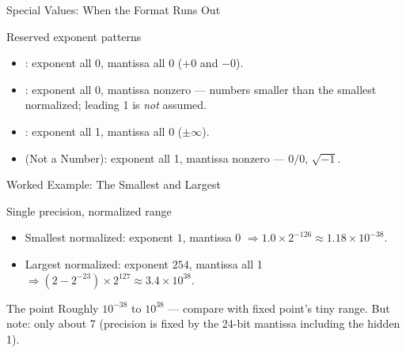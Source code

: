 \documentclass[aspectratio=169]{beamer}
\begin{document}
\begin{frame}{Special Values: When the Format Runs Out}
  \begin{block}{Reserved exponent patterns}
    \begin{itemize}
      \item {}: exponent all 0, mantissa all 0 ($+0$ and $-0$).
      \item {}: exponent all 0, mantissa nonzero ---
        numbers smaller than the smallest normalized; leading 1 is \emph{not}
        assumed.
      \item {}: exponent all 1, mantissa all 0 ($\pm\infty$).
      \item {} (Not a Number): exponent all 1, mantissa nonzero ---
        $0/0$, $\sqrt{-1}$.
    \end{itemize}
  \end{block}
  \vspace{0.2cm}
\end{frame}

\begin{frame}{Worked Example: The Smallest and Largest}
  \begin{block}{Single precision, normalized range}
    \begin{itemize}
      \item Smallest normalized: exponent $1$, mantissa 0 $\Rightarrow 1.0
        \times 2^{-126} \approx 1.18 \times 10^{-38}$.
      \item Largest normalized: exponent $254$, mantissa all 1 $\Rightarrow
        (2 - 2^{-23}) \times 2^{127} \approx 3.4 \times 10^{38}$.
    \end{itemize}
  \end{block}
  \begin{exampleblock}{The point}
    Roughly $10^{-38}$ to $10^{38}$ --- compare with fixed point's tiny range.
    But note: only about 7  (precision is
    fixed by the 24-bit mantissa including the hidden 1).
  \end{exampleblock}
\end{frame}
\end{document}

